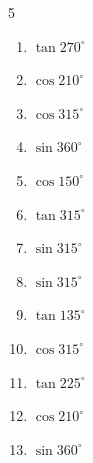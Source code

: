 \begin{multicols}{5}
\begin{enumerate}
  \item $\displaystyle \tan{270^\circ}$

        \phantom{$\displaystyle なし$}

  \item $\displaystyle \cos{210^\circ}$


  \item $\displaystyle \cos{315^\circ}$


  \item $\displaystyle \sin{360^\circ}$

        \phantom{$\displaystyle =0$}

  \item $\displaystyle \cos{150^\circ}$


  \item $\displaystyle \tan{315^\circ}$

        \phantom{$\displaystyle =-1$}

  \item $\displaystyle \sin{315^\circ}$


  \item $\displaystyle \sin{315^\circ}$


  \item $\displaystyle \tan{135^\circ}$

        \phantom{$\displaystyle =-1$}

\columnbreak %

  \item $\displaystyle \cos{315^\circ}$


  \item $\displaystyle \tan{225^\circ}$

        \phantom{$\displaystyle =1$}

  \item $\displaystyle \cos{210^\circ}$


  \item $\displaystyle \sin{360^\circ}$


\end{enumerate}
\end{multicols}
